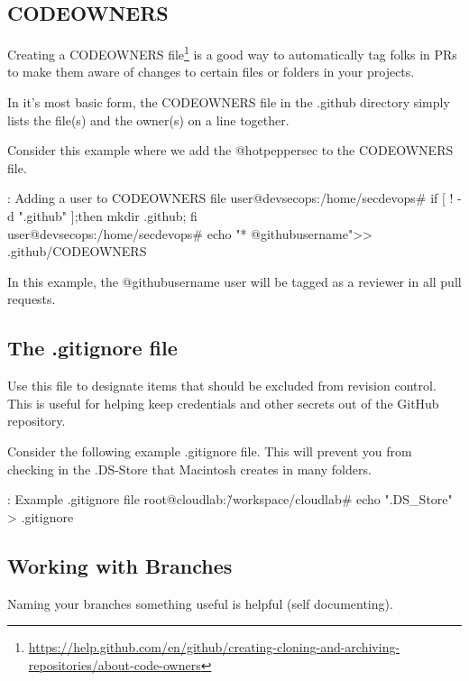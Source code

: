 \subsection{CODEOWNERS}

\justify
Creating a CODEOWNERS file\footnote{\url{https://help.github.com/en/github/creating-cloning-and-archiving-repositories/about-code-owners}}
is a good way to automatically tag folks in PRs to make them aware of
changes to certain files or folders in your projects.

\justify
In it's most basic form, the CODEOWNERS file in the .github directory
simply lists the file(s) and the owner(s) on a line together.

\justify
Consider this example where we add the @hotpeppersec to the CODEOWNERS
file.

\begin{mybox}{\thetcbcounter: Adding a user to CODEOWNERS file}
      user@devsecops:/home/secdevops\# if [ ! -d ".github" ];then mkdir .github; fi\\
      user@devsecops:/home/secdevops\# echo "* @githubusername">> .github/CODEOWNERS
\end{mybox}

In this example, the @githubusername user will be tagged as a reviewer
in all pull requests.


\subsection{The .gitignore file}
\justify
Use this file to designate items that should be excluded from revision
control. This is useful for helping keep credentials and other secrets
out of the GitHub repository.

\justify
Consider the following example .gitignore file. This will prevent you
from checking in the .DS-Store that Macintosh creates in many folders.

\begin{mybox}{\thetcbcounter: Example .gitignore file}
      root@cloudlab:\~/workspace/cloudlab\# echo ".DS\_Store" > .gitignore
\end{mybox}

\subsection{Working with Branches}

Naming your branches something useful is helpful (self documenting).

